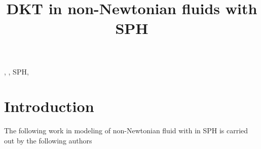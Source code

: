 \documentclass[preprint,12pt]{elsarticle}
\begin{document}
\begin{frontmatter}

  \title{DKT in non-Newtonian fluids with SPH}
  \author[]{}
  \ead{}
  \author[]{}
  \ead{}
\address[UoS]{}



\begin{abstract}

\end{abstract}

\begin{keyword}
{}, {}, {SPH}, {}


\end{keyword}

\end{frontmatter}


\section{Introduction}
\label{sec:intro}

The following work in modeling of non-Newtonian fluid with in SPH is carried
out by the following authors
\end{document}
